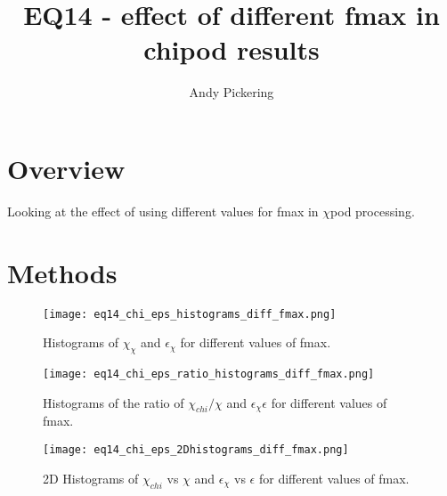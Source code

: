 \documentclass[11pt]{article}
\title{EQ14 - effect of different fmax in chipod results}
\author{Andy Pickering}
\begin{document}
\maketitle

\tableofcontents
\newpage

\section{Overview}

Looking at the effect of using different values for fmax in $\chi$pod processing. 





\section{Methods}

\begin{itemize}


\end{itemize}


\begin{figure}[htbp]
\texttt{[image: eq14\_chi\_eps\_histograms\_diff\_fmax.png]}
\caption{Histograms of $\chi_{\chi}$ and $\epsilon_{\chi}$ for different values of fmax.}
\label{}
\end{figure}

\begin{figure}[htbp]
\texttt{[image: eq14\_chi\_eps\_ratio\_histograms\_diff\_fmax.png]}
\caption{Histograms of the ratio of  $\chi_{chi}/\chi$ and $\epsilon_{\chi}\epsilon$ for different values of fmax.}
\label{}
\end{figure}



\begin{figure}[htbp]
\texttt{[image: eq14\_chi\_eps\_2Dhistograms\_diff\_fmax.png]}
\caption{2D Histograms of $\chi_{chi}$ vs $\chi$ and $\epsilon_{\chi}$ vs $\epsilon$ for different values of fmax.}
\label{}
\end{figure}
\end{document}
